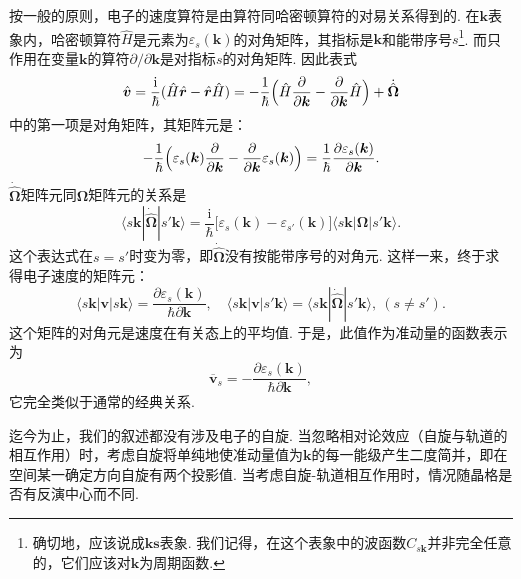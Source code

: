 按一般的原则，电子的速度算符是由算符同哈密顿算符的对易关系得到的. 在$\bm k$表象内，哈密顿算符$\hat H$是元素为$\varepsilon_s(\bm k)$的对角矩阵，其指标是$\bm k$和能带序号$s$\footnote{确切地，应该说成$\bm{k}\bm{s}$表象. 我们记得，在这个表象中的波函数$C_{s\bm k}$并非完全任意的，它们应该对$\bm k$为周期函数.}. 而只作用在变量$\bm k$的算符$\partial/\partial\bm k$是对指标$s$的对角矩阵. 因此表式
\begin{equation*}
\hat{\bm v}=\frac{\mathrm i}{\hbar}(\hat H\hat{\bm r}-\hat{\bm r}\hat H)
=-\frac{1}{\hbar}\Bigl(\hat H\frac{\partial}{\partial\bm k}-\frac{\partial}{\partial\bm k}\hat H\Bigr)+\dot{\hat{\bm\Omega}}
\end{equation*}
中的第一项是对角矩阵，其矩阵元是：
\begin{equation*}
-\frac{1}{\hbar}\Bigl(\varepsilon_s(\bm k)\frac{\partial}{\partial\bm k}-\frac{\partial}{\partial\bm k}\varepsilon_s(\bm k)\Bigr)
=\frac{1}{\hbar}\frac{\partial\varepsilon_s(\bm k)}{\partial\bm k}.
\end{equation*}
$\dot{\hat{\bm\Omega}}$矩阵元同$\bm\Omega$矩阵元的关系是
\begin{equation*}
\langle s\bm k|\dot{\hat{\bm\Omega}}|s'\bm k\rangle
=\frac{\mathrm i}{\hbar}\bigl[\varepsilon_s(\bm k)-\varepsilon_{s'}(\bm k)\bigr]\langle s\bm k|\bm\Omega|s'\bm k\rangle.
\end{equation*}
这个表达式在$s=s'$时变为零，即$\dot{\hat{\bm\Omega}}$没有按能带序号的对角元. 这样一来，终于求得电子速度的矩阵元：
\begin{equation}
\langle s\bm k|\bm v|s\bm k\rangle=\frac{\partial\varepsilon_s(\bm k)}{\hbar\partial\bm k},\quad
\langle s\bm k|\bm v|s'\bm k\rangle=\langle s\bm k|\dot{\hat{\bm\Omega}}|s'\bm k\rangle,\ (s\neq s').
\label{55.15}
\end{equation}
这个矩阵的对角元是速度在有关态上的平均值. 于是，此值作为准动量的函数表示为
\begin{equation}
\overline{\bm v}_s=-\frac{\partial\varepsilon_s(\bm k)}{\hbar\partial\bm k},
\label{55.16}
\end{equation}
它完全类似于通常的经典关系.

迄今为止，我们的叙述都没有涉及电子的自旋. 当忽略相对论效应（自旋与轨道的相互作用）时，考虑自旋将单纯地使准动量值为$\bm k$的每一能级产生二度简并，即在空间某一确定方向自旋有两个投影值. 当考虑自旋-轨道相互作用时，情况随晶格是否有反演中心而不同.

